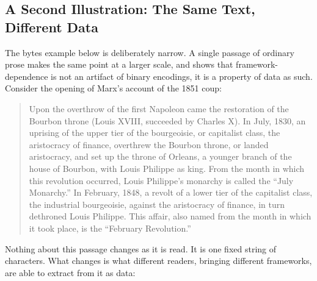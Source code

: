 \subsection{A Second Illustration: The Same Text, Different Data}
\label{sub:second-illustration}

The bytes example below is deliberately narrow. A single passage of ordinary
prose makes the same point at a larger scale, and shows that
framework-dependence is not an artifact of binary encodings, it is a property
of data as such. Consider the opening of Marx's account of the 1851 coup:

\begin{quote}
Upon the overthrow of the first Napoleon came the restoration of the Bourbon
throne (Louis XVIII, succeeded by Charles X). In July, 1830, an uprising of
the upper tier of the bourgeoisie, or capitalist class, the aristocracy of
finance, overthrew the Bourbon throne, or landed aristocracy, and set up the
throne of Orleans, a younger branch of the house of Bourbon, with Louis
Philippe as king. From the month in which this revolution occurred, Louis
Philippe's monarchy is called the ``July Monarchy.'' In February, 1848, a
revolt of a lower tier of the capitalist class, the industrial bourgeoisie,
against the aristocracy of finance, in turn dethroned Louis Philippe. This
affair, also named from the month in which it took place, is the ``February
Revolution.''~\autocite{marx1852}
\end{quote}
\newpage Nothing about this passage changes as it is read. It is one fixed string of
characters. What changes is what different readers, bringing different
frameworks, are able to extract from it as data:

